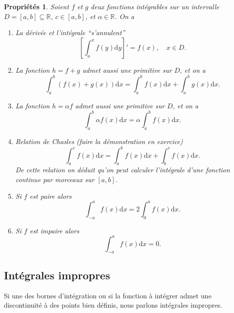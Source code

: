 \documentclass[a4paper,12pt]{book}
\newcommand{\real}{\mathbb{R}}
\newcommand{\dd}{\mathrm{d}}
\newtheorem{proprietes}{Propriétés}
\begin{document}
\begin{proprietes}
Soient $f$ et $g$ deux fonctions intégrables sur un intervalle $D=[a,b]\subseteq\real$, $c\in[a,b]$, et $\alpha\in\real$.
On a
\begin{enumerate}
 \item La dérivée et l'intégrale ``s'annulent'' 
 \begin{equation}
  \left[\int_a^x f(y)\dd y\right]'=f(x), \quad x\in D.
 \end{equation}
 \item La fonction $h=f+g$ admet aussi une primitive sur $D$, et on a
 \begin{equation}
  \int_a^b(f(x)+g(x))\dd x=\int_a^b f(x)\dd x+\int_a^b g(x)\dd x.
 \end{equation}
 \item La fonction $h=\alpha f$ admet aussi une primitive sur $D$, et on a
 \begin{equation}
  \int_a^b\alpha f(x)\dd x=\alpha\int_a^b f(x)\dd x.
 \end{equation}
\item Relation de Chasles (faire la démonstration en exercice)
\begin{equation}
\int_a^c f(x)\dd x=\int_a^b f(x)\dd x+\int_b^c f(x)\dd x.
\end{equation}
De cette relation on déduit qu'on peut calculer l'intégrale d'une fonction
continue par morceaux sur $[a,b]$.
\item Si $f$ est paire alors
\begin{equation}
\int_{-a}^a f(x)\dd x = 2\int_0^a f(x)\dd x.
\end{equation}
\item Si $f$ est impaire alors
\begin{equation}
\int_{-a}^a f(x)\dd x = 0.
\end{equation}
\end{enumerate}
\end{proprietes}



\subsection{Intégrales impropres}

Si une des bornes d'intégration ou si la fonction à intégrer admet une discontinuité à des points bien définis, nous
parlons intégrales impropres.
\end{document}

